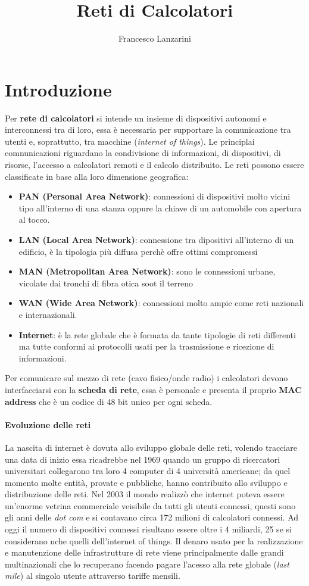 \documentclass{article}
\title{Reti di Calcolatori}
\author{Francesco Lanzarini}
\date{ }
\begin{document}
\maketitle

\section{Introduzione}
Per \textbf{rete di calcolatori} si intende un insieme di dispositivi autonomi
e interconnessi tra di loro, essa è necessaria per supportare la comunicazione
tra utenti e, soprattutto, tra macchine (\textit{internet of things}). Le
principlai comnunicazioni riguardano la condivisione di informazioni, di
dispositivi, di risorse, l'accesso a calcolatori remoti e il calcolo
distribuito. Le reti possono essere classificate in base alla loro dimensione
geografica:
\begin{itemize}
    \item \textbf{PAN (Personal Area Network)}: connessioni di dispositivi molto vicini tipo all'interno di una stanza oppure la chiave di un automobile con apertura al tocco.
    \item \textbf{LAN (Local Area Network)}: connessione tra dipositivi all'interno di un edificio, è la tipologia più diffusa perchè offre ottimi compromessi
    \item \textbf{MAN (Metropolitan Area Network)}: sono le connessioni urbane, vicolate dai tronchi di fibra otica soot il terreno
    \item \textbf{WAN (Wide Area Network)}: connessioni molto ampie come reti nazionali e internazionali.
    \item \textbf{Internet}: è la rete globale che è formata da tante tipologie di reti differenti ma tutte conformi ai protocolli usati per la trasmissione e ricezione di informazioni.
\end{itemize}

Per comunicare sul mezzo di rete (cavo fisico/onde radio) i calcolatori devono
interfacciarsi con la \textbf{scheda di rete}, essa è personale e presenta il
proprio \textbf{MAC address} che è un codice di 48 bit unico per ogni scheda.
\paragraph{Evoluzione delle reti}
La nascita di internet è dovuta allo sviluppo globale delle reti, volendo
tracciare una data di inizio essa ricadrebbe nel 1969 quando un gruppo di
ricercatori universitari collegarono tra loro 4 computer di 4 università
americane; da quel momento molte entità, provate e pubbliche, hanno contribuito
allo sviluppo e distribuzione delle reti. Nel 2003 il mondo realizzò che
internet poteva essere un'enorme vetrina commerciale veisibile da tutti gli
utenti connessi, questi sono gli anni delle \textit{dot com} e si contavano
circa 172 milioni di calcolatori connessi. Ad oggi il numero di dispositivi
connessi risultano essere oltre i 4 miliardi, 25 se si considerano nche quelli
dell'internet of things. Il denaro usato per la realizzazione e manutenzione
delle infrastrutture di rete viene principalmente dalle grandi multinazionali
che lo recuperano facendo pagare l'acesso alla rete globale (\textit{last
    mile}) al singolo utente attraverso tariffe mensili.
\end{document}
